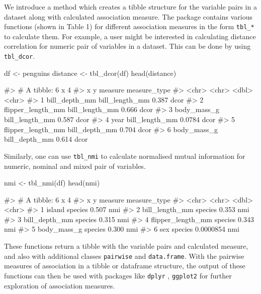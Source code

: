 We introduce a method which creates a tibble structure for the variable
pairs in a dataset along with calculated association measure. The
package contains various functions (shown in Table 1) for different
association measures in the form \texttt{tbl\_*} to calculate them. For
example, a user might be interested in calculating distance correlation
for numeric pair of variables in a dataset. This can be done by using
\texttt{tbl\_dcor}.

\begin{Schunk}
\begin{Sinput}
df <- penguins
distance <- tbl_dcor(df)
head(distance)
\end{Sinput}
\begin{Soutput}
#> # A tibble: 6 x 4
#>   x                 y              measure measure_type
#>   <chr>             <chr>            <dbl> <chr>       
#> 1 bill_depth_mm     bill_length_mm  0.387  dcor        
#> 2 flipper_length_mm bill_length_mm  0.666  dcor        
#> 3 body_mass_g       bill_length_mm  0.587  dcor        
#> 4 year              bill_length_mm  0.0784 dcor        
#> 5 flipper_length_mm bill_depth_mm   0.704  dcor        
#> 6 body_mass_g       bill_depth_mm   0.614  dcor
\end{Soutput}
\end{Schunk}

Similarly, one can use \texttt{tbl\_nmi} to calculate normalised mutual
information for numeric, nominal and mixed pair of variables.

\begin{Schunk}
\begin{Sinput}
nmi <- tbl_nmi(df)
head(nmi)
\end{Sinput}
\begin{Soutput}
#> # A tibble: 6 x 4
#>   x                 y         measure measure_type
#>   <chr>             <chr>       <dbl> <chr>       
#> 1 island            species 0.507     nmi         
#> 2 bill_length_mm    species 0.353     nmi         
#> 3 bill_depth_mm     species 0.315     nmi         
#> 4 flipper_length_mm species 0.343     nmi         
#> 5 body_mass_g       species 0.300     nmi         
#> 6 sex               species 0.0000854 nmi
\end{Soutput}
\end{Schunk}

These functions return a tibble with the variable pairs and calculated
measure, and also with additional classes \texttt{pairwise} and
\texttt{data.frame}. With the pairwise measures of association in a
tibble or dataframe structure, the output of these functions can then be
used with packages like \texttt{dplyr} , \texttt{ggplot2} for further
exploration of association measures.

